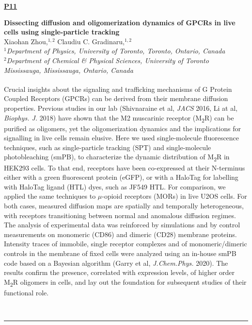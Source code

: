 \documentclass[titlepage,oneside,openany,10pt]{book}
\newenvironment{posterabs}[4] %
        {
	\begin{flushright}
                \underline{\textbf{#4}}
        \end{flushright}
        \textbf{#1}\\%
        #2\\%
        \textit{#3}\\\\%
        }
        {
        \\
        \noindent\rule{15cm}{0.5pt}%
        }
\begin{document}
\vspace{1cm}

\begin{posterabs}
	{Dissecting diffusion and oligomerization dynamics of GPCRs in live cells using single-particle tracking}
	{Xiaohan Zhou,$^{1,2}$ Claudiu C. Gradinaru,$^{1,2}$}
	{
	$^1$Department of Physics, University of Toronto, Toronto, Ontario, Canada\\
	$^2$Department of Chemical \& Physical Sciences, University of Toronto Mississauga, Mississauga, Ontario, Canada
	}
	{P11}
	Crucial insights about the signaling and trafficking mechanisms of G Protein Coupled Receptors (GPCRs) can be derived from their membrane diffusion properties. Previous studies in our lab (Shivnaraine et al, \emph{JACS} 2016, Li at al, \emph{Biophys. J.} 2018) have shown that the M2 muscarinic receptor (M\textsubscript{2}R) can be purified as oligomers, yet the oligomerization dynamics and the implications for signalling in live cells remain elusive. Here we used single-molecule fluorescence techniques, such as single-particle tracking (SPT) and single-molecule photobleaching (smPB), to characterize the dynamic distribution of M\textsubscript{2}R in HEK293 cells. To that end, receptors have been co-expressed at their N-terminus either with a green fluorescent protein (eGFP), or with a HaloTag for labelling with HaloTag ligand (HTL) dyes, such as JF549 HTL. For comparison, we applied the same techniques to $\mu$-opioid receptors (MORs) in live U2OS cells. For both cases, measured diffusion maps are spatially and temporally heterogeneous, with receptors transitioning between normal and anomalous diffusion regimes. The analysis of experimental data was reinforced by simulations and by control measurements on monomeric (CD86) and dimeric (CD28) membrane proteins. Intensity traces of immobile, single receptor complexes and of monomeric/dimeric controls in the membrane of fixed cells were analyzed using an in-house smPB code based on a Bayesian algorithm (Garry et al, \emph{J.Chem.Phys.} 2020). The results confirm the presence, correlated with expression levels, of higher order M\textsubscript{2}R oligomers in cells, and lay out the foundation for subsequent studies of their functional role.
	\label{ZhouX}
\end{posterabs}
\end{document}
